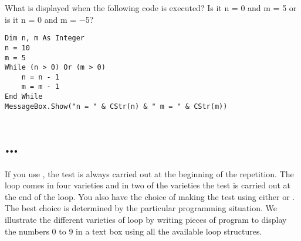 		\begin{stqb}
			\begin{STQ}
			\item What is displayed when the following code is executed? Is it n = 0 and m = 5 or is it n = 0 and m = −5?
				\begin{lstlisting}
Dim n, m As Integer
n = 10
m = 5
While (n > 0) Or (m > 0)
	n = n - 1
	m = m - 1
End While
MessageBox.Show("n = " & CStr(n) & " m = " & CStr(m))	
				\end{lstlisting}
			\end{STQ}
		\end{stqb}


	\section{…}
		If you use , the test is always carried out at the beginning of the repetition. The  loop comes in four varieties and in two of the varieties the test is carried out at the end of the loop. You also have the choice of making the test using either  or . The best choice is determined by the particular programming situation. We illustrate the different varieties of  loop by writing pieces of program to display the numbers 0 to 9 in a text box using all the available loop structures.
		
